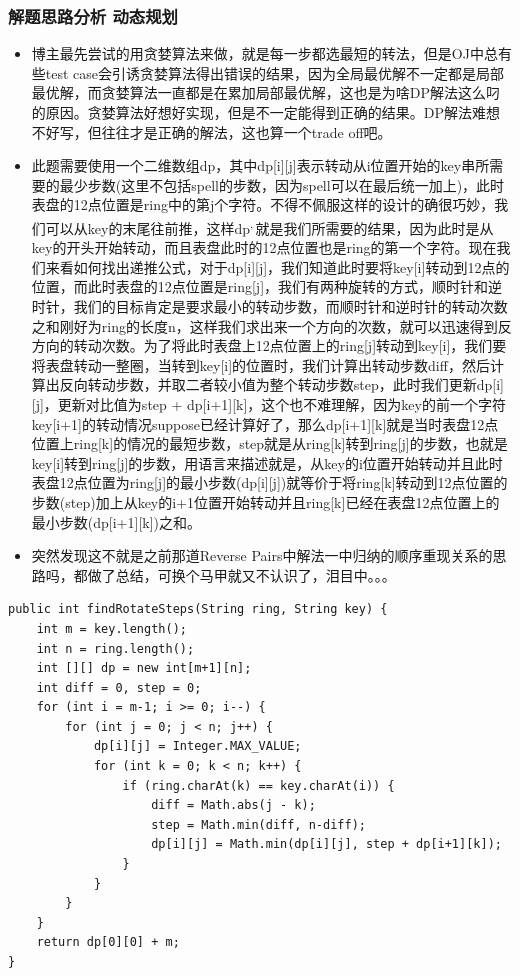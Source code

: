 \documentclass[9pt, b5paper]{article}
\begin{document}
\subsubsection{解题思路分析 动态规划}
\label{sec-4-3-2}
\begin{itemize}
\item 博主最先尝试的用贪婪算法来做，就是每一步都选最短的转法，但是OJ中总有些test case会引诱贪婪算法得出错误的结果，因为全局最优解不一定都是局部最优解，而贪婪算法一直都是在累加局部最优解，这也是为啥DP解法这么叼的原因。贪婪算法好想好实现，但是不一定能得到正确的结果。DP解法难想不好写，但往往才是正确的解法，这也算一个trade off吧。
\item 此题需要使用一个二维数组dp，其中dp[i][j]表示转动从i位置开始的key串所需要的最少步数(这里不包括spell的步数，因为spell可以在最后统一加上)，此时表盘的12点位置是ring中的第j个字符。不得不佩服这样的设计的确很巧妙，我们可以从key的末尾往前推，这样dp\footnotemark[3]{}\textsuperscript{,}\,\footnotemark[3]{}就是我们所需要的结果，因为此时是从key的开头开始转动，而且表盘此时的12点位置也是ring的第一个字符。现在我们来看如何找出递推公式，对于dp[i][j]，我们知道此时要将key[i]转动到12点的位置，而此时表盘的12点位置是ring[j]，我们有两种旋转的方式，顺时针和逆时针，我们的目标肯定是要求最小的转动步数，而顺时针和逆时针的转动次数之和刚好为ring的长度n，这样我们求出来一个方向的次数，就可以迅速得到反方向的转动次数。为了将此时表盘上12点位置上的ring[j]转动到key[i]，我们要将表盘转动一整圈，当转到key[i]的位置时，我们计算出转动步数diff，然后计算出反向转动步数，并取二者较小值为整个转动步数step，此时我们更新dp[i][j]，更新对比值为step + dp[i+1][k]，这个也不难理解，因为key的前一个字符key[i+1]的转动情况suppose已经计算好了，那么dp[i+1][k]就是当时表盘12点位置上ring[k]的情况的最短步数，step就是从ring[k]转到ring[j]的步数，也就是key[i]转到ring[j]的步数，用语言来描述就是，从key的i位置开始转动并且此时表盘12点位置为ring[j]的最小步数(dp[i][j])就等价于将ring[k]转动到12点位置的步数(step)加上从key的i+1位置开始转动并且ring[k]已经在表盘12点位置上的最小步数(dp[i+1][k])之和。
\item 突然发现这不就是之前那道Reverse Pairs中解法一中归纳的顺序重现关系的思路吗，都做了总结，可换个马甲就又不认识了，泪目中。。。
\end{itemize}
\begin{verbatim}
public int findRotateSteps(String ring, String key) {
    int m = key.length(); 
    int n = ring.length();
    int [][] dp = new int[m+1][n];
    int diff = 0, step = 0;
    for (int i = m-1; i >= 0; i--) {
        for (int j = 0; j < n; j++) {
            dp[i][j] = Integer.MAX_VALUE;
            for (int k = 0; k < n; k++) {
                if (ring.charAt(k) == key.charAt(i)) {
                    diff = Math.abs(j - k);
                    step = Math.min(diff, n-diff);
                    dp[i][j] = Math.min(dp[i][j], step + dp[i+1][k]);
                }
            }
        }
    }
    return dp[0][0] + m;
}
\end{verbatim}
\end{document}
